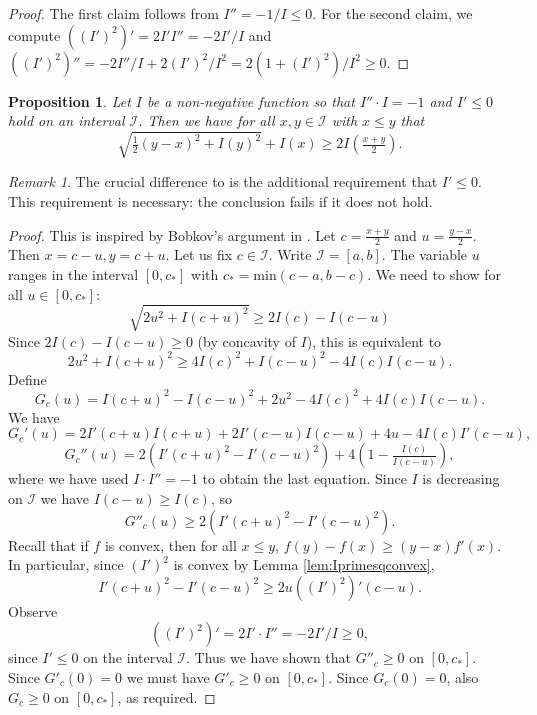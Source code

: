 \documentclass[12pt]{amsart}
\theoremstyle{plain}
\newtheorem{prop}[thm]{Proposition}
\theoremstyle{definition}
\theoremstyle{remark}
\newtheorem{rem}[thm]{Remark}
\numberwithin{equation}{section}
\begin{document}
\begin{proof}
The first claim follows from $I''=-1/I\le 0$. For the second claim, we compute $((I')^2)' = 2 I' I'' = -2I'/I$ and 
$((I')^2)'' = -2I''/I + 2(I')^2/I^2 = 2 (1+(I')^2)/I^2 \ge 0$.
\end{proof}

\begin{prop}\label{prop:twoptbobkov}
Let $I$ be a non-negative function so that $I''\cdot I=-1$ and $I'\le 0$ hold on an interval $\mathcal{I}$.
Then we have for all $x,y\in \mathcal{I}$ with $x\le y$ that
\begin{equation}\label{eqn:onesidedtwoptI} \sqrt{\tfrac12 (y-x)^2 + I(y)^2} + I(x) \ge 2 I(\tfrac{x+y}{2}).
\end{equation}
\end{prop}

\begin{rem}
The crucial difference to \cite{Bob97} is the additional requirement that $I'\le 0$.
This requirement is necessary: the conclusion  fails if it does not hold.
\end{rem}


\begin{proof}
This is inspired by Bobkov's argument in \cite{Bob97}.
Let $c=\frac{x+y}{2}$ and $u=\frac{y-x}{2}$. Then $x=c-u, y=c+u$.
Let us fix $c\in \mathcal{I}$. Write $\mathcal{I}=[a,b]$.
The variable $u$ ranges in the interval $[0, c_*]$ with 
$c_* = \mathrm{min}(c-a, b-c)$.
We need to show for all $u\in [0, c_*]$:
\[ \sqrt{2u^2 + I(c+u)^2} \ge 2 I(c) - I(c-u)\]
Since $2I(c) - I(c-u)\ge 0$ (by concavity of $I$), this is equivalent to
\[ 2u^2 + I(c+u)^2 \ge 4 I(c)^2 + I(c-u)^2 - 4 I(c) I(c-u). \]
Define 
\[ G_c(u) = I(c+u)^2 - I(c-u)^2 + 2u^2  - 4I(c)^2 + 4 I(c) I(c-u).\]
We have 
\[ G_c'(u) = 2 I'(c+u)I(c+u) + 2 I'(c-u)I(c-u) + 4u - 4 I(c) I'(c-u),\]
\[ G_c''(u) = 2(I'(c+u)^2 - I'(c-u)^2) + 4(1- \tfrac{I(c)}{I(c-u)}) ,\]
where we have used $I\cdot I''=-1$ to obtain the last equation.
Since $I$ is decreasing on $\mathcal{I}$ we have $I(c-u)\ge I(c)$, so
\[ G''_c(u) \ge 2 (I'(c+u)^2 - I'(c-u)^2). \]
Recall that if $f$ is convex, then for all $x\le y$,
$f(y)-f(x) \ge (y-x)f'(x).$
In particular, since $(I')^2$ is convex by Lemma \ref{lem:Iprimesqconvex},
\[ I'(c+u)^2 - I'(c-u)^2 \ge 2u ((I')^2)'(c-u). \]
Observe 
\[ ((I')^2)' = 2 I' \cdot I'' = - 2 I' / I \ge 0, \]
since $I'\le 0$ on the interval $\mathcal{I}$.
Thus we have shown that $G''_c\ge 0$ on $[0, c_*]$.
Since $G'_c(0) = 0$ we must have $G'_c\ge 0$ on $[0, c_*]$.
Since $G_c(0)=0$, also $G_c\ge 0$ on $[0, c_*]$, as required.
\end{proof}
\end{document}
